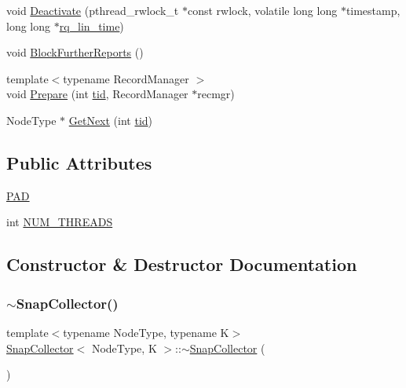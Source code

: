 \begin{DoxyCompactItemize}
void \hyperlink{classSnapCollector_a56d824c8e580ccb9422edcef9a26e636}{Deactivate} (pthread\+\_\+rwlock\+\_\+t $\ast$const rwlock, volatile long long $\ast$timestamp, long long $\ast$\hyperlink{rq__unsafe_8h_a643fd1eef8dbd00706b939b113a76394}{rq\+\_\+lin\+\_\+time})
\item 
void \hyperlink{classSnapCollector_a0848f9cf2e792a241809d9ff23a24bab}{Block\+Further\+Reports} ()
\item 
{\footnotesize template$<$typename Record\+Manager $>$ }\\void \hyperlink{classSnapCollector_a8c2b96dd6ec25eb4abfdc0c1ba2abc29}{Prepare} (int \hyperlink{microbench_2main_8cpp_a9ca9869868fe7e7a38a921cc7de4103f}{tid}, Record\+Manager $\ast$recmgr)
\item 
Node\+Type $\ast$ \hyperlink{classSnapCollector_afbc67dba82450f2d89099b0614c83804}{Get\+Next} (int \hyperlink{microbench_2main_8cpp_a9ca9869868fe7e7a38a921cc7de4103f}{tid})
\end{DoxyCompactItemize}
\subsection*{Public Attributes}
\begin{DoxyCompactItemize}
\item 
\hyperlink{classSnapCollector_a1e71ab6f1d3af03e0042459d31a98b95}{P\+AD}
\item 
int \hyperlink{classSnapCollector_a8c45790cee8b96758a8e98d7d7c8faf7}{N\+U\+M\+\_\+\+T\+H\+R\+E\+A\+DS}
\end{DoxyCompactItemize}


\subsection{Constructor \& Destructor Documentation}
\mbox{\label{classSnapCollector_afe44bffcd16d6f6cd54c313be9703e52}} 
\subsubsection{\texorpdfstring{$\sim$\+Snap\+Collector()}{~SnapCollector()}}
{\footnotesize\ttfamily template$<$typename Node\+Type, typename K$>$ \\
\hyperlink{classSnapCollector}{Snap\+Collector}$<$ Node\+Type, K $>$\+::$\sim$\hyperlink{classSnapCollector}{Snap\+Collector} (\begin{DoxyParamCaption}{ }\end{DoxyParamCaption})\hspace{0.3cm}{\ttfamily [inline]}}



